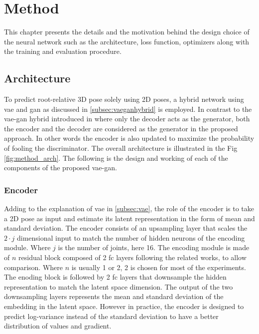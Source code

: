 \chapter{Method}
\label{chap:method}


This chapter presents the details and the motivation behind the design choice of the neural network such as the architecture, loss function, optimizers along with the training and evaluation procedure.

\section{Architecture}
To predict root-relative 3D pose solely using 2D poses, a hybrid network using \ac{vae} and \ac{gan} as discussed in \ref{subsec:vaeganhybrid} is employed. In contrast to the \ac{vae}-\ac{gan} hybrid introduced in \cite{autoencoding_beyond_pixels} where only the decoder acts as the generator, both the encoder and the decoder are considered as the generator in the proposed approach. In other words the encoder is also updated to maximize the probability of fooling the discriminator. The overall architecture is illustrated in the Fig \ref{fig:method_arch}. The following is the design and working of each of the components of the proposed \ac{vae}-{gan}.

\subsection{Encoder}

Adding to the explanation of \ac{vae} in \ref{subsec:vae}, the role of the encoder is to take a 2D pose as input and estimate its latent representation in the form of mean and standard deviation. The encoder consists of an upsampling layer that scales the $2 \cdot j$ dimensional input to match the number of hidden neurons of the encoding module. Where $j$ is the number of joints, here 16. The encoding module is made of $n$ residual block composed of 2 \ac{fc} layers following the related works, to allow comparison. Where $n$ is usually 1 or 2, 2 is chosen for most of the experiments. The enoding block is followed by 2 \ac{fc} layers that downsample the hidden representation to match the latent space dimension. The output of the two downsampling layers represents the mean and standard deviation of the embedding in the latent space. However in practice, the encoder is designed to predict log-variance instead of the standard deviation to have a better distribution of values and gradient. 

